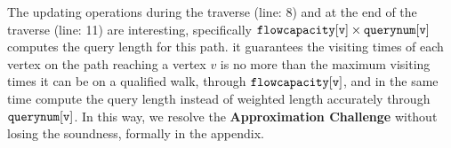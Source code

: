  The updating operations
 during the traverse 
 (line: 8) and 
 at the end of the traverse (line: 11) are interesting,
 specifically $\mathtt{flowcapacity[v] \times querynum[v]}$ 
 computes the query length for this path. 
 it guarantees 
 the visiting times of each vertex on the path reaching a vertex $v$ is no more than 
 the maximum visiting times it can be on a qualified walk, through $\mathtt{flowcapacity[v]}$,
 and in the same time  compute the query length instead of weighted length accurately through 
 $\mathtt{ querynum[v]}$.
 In this way, we resolve the \textbf{Approximation Challenge} without losing the soundness, formally in the appendix.
 
